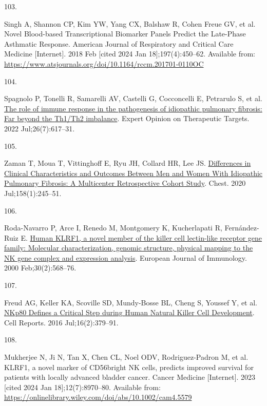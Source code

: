 \documentclass[
]{article}
\newlength{\cslhangindent}
\newlength{\csllabelwidth}
\newenvironment{CSLReferences}[2] %
 {\begin{list}{}{%
  \setlength{\itemindent}{0pt}
  \setlength{\leftmargin}{0pt}
  \setlength{\parsep}{0pt}
  \ifodd #1
   \setlength{\leftmargin}{\cslhangindent}
   \setlength{\itemindent}{-1\cslhangindent}
  \fi
  \setlength{\itemsep}{#2\baselineskip}}}
 {\end{list}}
\newcommand{\CSLLeftMargin}[1]{\parbox[t]{\csllabelwidth}{\strut#1\strut}}
\newcommand{\CSLRightInline}[1]{\parbox[t]{\linewidth - \csllabelwidth}{\strut#1\strut}}
\begin{document}
\begin{CSLReferences}{0}{1}
\CSLLeftMargin{103. }%
\CSLRightInline{Singh A, Shannon CP, Kim YW, Yang CX, Balshaw R, Cohen Freue GV, et al. Novel {Blood}-based {Transcriptional} {Biomarker} {Panels} {Predict} the {Late}-{Phase} {Asthmatic} {Response}. American Journal of Respiratory and Critical Care Medicine {[}Internet{]}. 2018 Feb {[}cited 2024 Jan 18{]};197(4):450--62. Available from: \url{https://www.atsjournals.org/doi/10.1164/rccm.201701-0110OC}}

\CSLLeftMargin{104. }%
\CSLRightInline{Spagnolo P, Tonelli R, Samarelli AV, Castelli G, Cocconcelli E, Petrarulo S, et al. \href{https://doi.org/10.1080/14728222.2022.2114897}{The role of immune response in the pathogenesis of idiopathic pulmonary fibrosis: Far beyond the {Th1}/{Th2} imbalance}. Expert Opinion on Therapeutic Targets. 2022 Jul;26(7):617--31. }

\CSLLeftMargin{105. }%
\CSLRightInline{Zaman T, Moua T, Vittinghoff E, Ryu JH, Collard HR, Lee JS. \href{https://doi.org/10.1016/j.chest.2020.02.009}{Differences in {Clinical} {Characteristics} and {Outcomes} {Between} {Men} and {Women} {With} {Idiopathic} {Pulmonary} {Fibrosis}: {A} {Multicenter} {Retrospective} {Cohort} {Study}}. Chest. 2020 Jul;158(1):245--51. }

\CSLLeftMargin{106. }%
\CSLRightInline{Roda-Navarro P, Arce I, Renedo M, Montgomery K, Kucherlapati R, Fernández-Ruiz E. \href{https://doi.org/10.1002/1521-4141(200002)30:2\%3C568::AID-IMMU568\%3E3.0.CO;2-Y}{Human {KLRF1}, a novel member of the killer cell lectin-like receptor gene family: Molecular characterization, genomic structure, physical mapping to the {NK} gene complex and expression analysis}. European Journal of Immunology. 2000 Feb;30(2):568--76. }

\CSLLeftMargin{107. }%
\CSLRightInline{Freud AG, Keller KA, Scoville SD, Mundy-Bosse BL, Cheng S, Youssef Y, et al. \href{https://doi.org/10.1016/j.celrep.2016.05.095}{{NKp80} {Defines} a {Critical} {Step} during {Human} {Natural} {Killer} {Cell} {Development}}. Cell Reports. 2016 Jul;16(2):379--91. }

\CSLLeftMargin{108. }%
\CSLRightInline{Mukherjee N, Ji N, Tan X, Chen CL, Noel ODV, Rodriguez-Padron M, et al. {KLRF1}, a novel marker of {CD56bright} {NK} cells, predicts improved survival for patients with locally advanced bladder cancer. Cancer Medicine {[}Internet{]}. 2023 {[}cited 2024 Jan 18{]};12(7):8970--80. Available from: \url{https://onlinelibrary.wiley.com/doi/abs/10.1002/cam4.5579}}


\end{CSLReferences}
\end{document}
